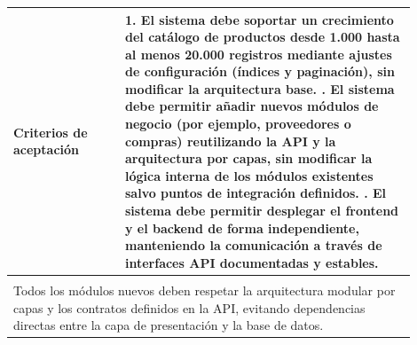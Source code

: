 \begin{longtable}{|p{0.25\linewidth}|p{0.15\linewidth}|p{0.15\linewidth}|p{0.35\linewidth}|}
		\cellcolor{tableheaderblue}\textbf{Criterios de aceptación} & \multicolumn{3}{p{0.70\linewidth}|}{                                                                                                                                              %
			1. El sistema debe soportar un crecimiento del catálogo de productos desde 1.000 hasta al menos 20.000 registros mediante ajustes de configuración (índices y paginación), sin modificar la arquitectura base. \newline
			2. El sistema debe permitir añadir nuevos módulos de negocio (por ejemplo, proveedores o compras) reutilizando la API y la arquitectura por capas, sin modificar la lógica interna de los módulos existentes salvo puntos de integración definidos. \newline
		3. El sistema debe permitir desplegar el frontend y el backend de forma independiente, manteniendo la comunicación a través de interfaces API documentadas y estables.}                                                                         \\ \hline
		\rowcolor{tableheaderblue}
		\multicolumn{4}{|l|}{\textbf{Restricciones}}                                                                                                                                                                                                    \\ \hline
		\multicolumn{4}{|p{0.96\linewidth}|}{%
		Todos los módulos nuevos deben respetar la arquitectura modular por capas y los contratos definidos en la API, evitando dependencias directas entre la capa de presentación y la base de datos.}                                                \\ \hline
	
\end{longtable}
\endgroup



